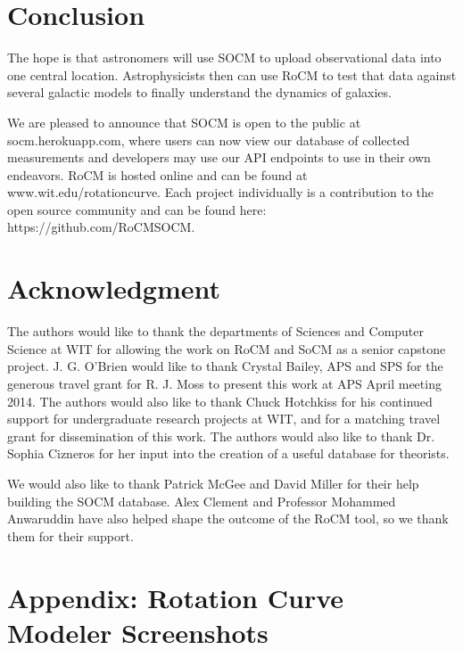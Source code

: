 \documentclass[conference]{IEEEtran-modified}
\begin{document}
\newpage

\section{Conclusion}
The hope is that astronomers will use SOCM to upload observational data into one central location. Astrophysicists then can use RoCM to test that data against several galactic models to finally understand the dynamics of galaxies. 

	 We are pleased to announce that SOCM is open to the public at socm.herokuapp.com, where users can now view our database of collected measurements and developers may use our API endpoints to use in their own endeavors. RoCM is hosted online and can be found at www.wit.edu/rotationcurve. Each project individually is a contribution to the open source community and can be found here: https://github.com/RoCMSOCM.



\section*{Acknowledgment}

The authors would like to thank the departments of Sciences and Computer Science at WIT for allowing the work on RoCM and SoCM as a senior capstone project. J. G. O'Brien would like to thank Crystal Bailey, APS and SPS for the generous travel grant for R. J. Moss to present this work at APS April meeting 2014. The authors would also like to thank Chuck Hotchkiss for his continued support for undergraduate research projects at WIT, and for a matching travel grant for dissemination of this work. The authors would also like to thank Dr. Sophia Cizneros for her input into the creation of a useful database for theorists.

We would also like to thank Patrick McGee and David Miller for their help building the SOCM database. Alex Clement and Professor Mohammed Anwaruddin have also helped shape the outcome of the RoCM tool, so we thank them for their support.






\hspace{\textwidth}

\section*{Appendix: Rotation Curve Modeler Screenshots}
\end{document}
